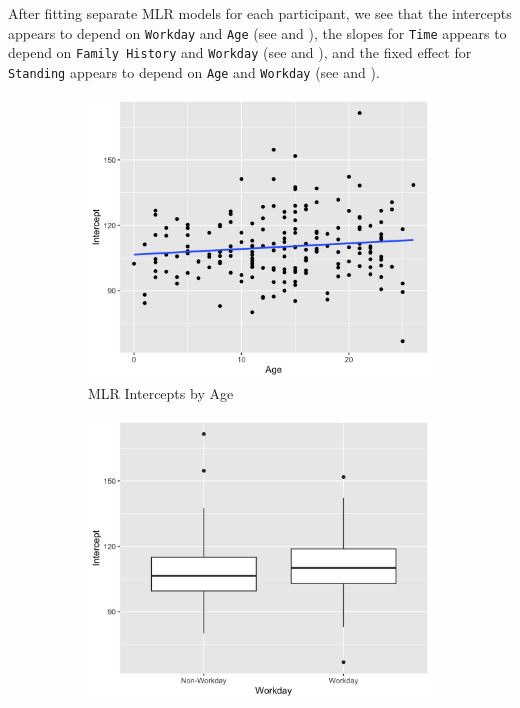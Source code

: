 \documentclass[12pt,twoside,letterpaper]{article}
\theoremstyle{definition}
\theoremstyle{definition}
\begin{document}
After fitting separate MLR models for each participant, we see that the intercepts appears to depend on \texttt{Workday} and \texttt{Age} (see  and ), the slopes for \texttt{Time} appears to depend on \texttt{Family History} and \texttt{Workday} (see  and ), and the fixed effect for \texttt{Standing} appears to depend on \texttt{Age} and \texttt{Workday} (see  and ).

\begin{figure} 
    \centering
    \begin{subfigure}[b]{0.32\textwidth}
    \centering
    \includegraphics[width=\textwidth]{pics/mlr int by age.png}
    \caption[]%
    {{\small MLR Intercepts by Age}}
    \label{fig: int v age}
    \end{subfigure}
    \hfill
    \begin{subfigure}[b]{0.32\textwidth}
    \centering
    \includegraphics[width=\textwidth]{pics/mlr int by day.png}

\end{subfigure}
\end{figure}
\end{document}
